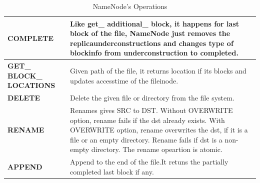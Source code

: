 \begin{table}[t]
\begin{tabular}{|l|p{12cm}|}
\hline
\textbf{COMPLETE}& Like  get\_ additional\_ block,  it  happens   for  last
    block   of  the  file,  NameNode  just  removes   the
          replicaunderconstructions   and  changes   type  of
               blockinfo from underconstruction to completed.
 \\
\hline
\textbf{GET\_ BLOCK\_ LOCATIONS}& Given  path  of  the  file,  it  returns   location  if  its
        blocks and updates accesstime of the fileinode.
 \\ 
 \hline
 \textbf{DELETE} & Delete the given file or directory from the file system.\\
 \hline
 \textbf{RENAME} & Renames gives SRC to DST. Without OVERWRITE option, rename fails if the dst already exists. With OVERWRITE option, rename overwrites the dst, if it is a file 
    or an empty directory. Rename fails if dst is a non-empty directory. The rename opeartion is atomic.\\
\hline 
 \textbf{APPEND} & Append to the end of the file.It retuns the partially completed last block if any. \\
 \hline
\end{tabular}
\caption{NameNode's Operations}
\label{NameNode_Ops}
\end{table}

